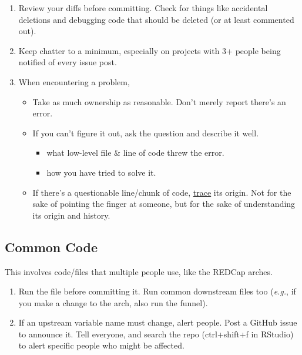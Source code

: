 \documentclass[]{book}
\providecommand{\tightlist}{%
  \setlength{\itemsep}{0pt}\setlength{\parskip}{0pt}}
\begin{document}
\begin{enumerate}
\def\labelenumi{\arabic{enumi}.}
\item
  Review your diffs before committing. Check for things like accidental deletions and debugging code that should be deleted (or at least commented out).
\item
  Keep chatter to a minimum, especially on projects with 3+ people being notified of every issue post.
\item
  When encountering a problem,

  \begin{itemize}
  \tightlist
  \item
    Take as much ownership as reasonable. Don't merely report there's an error.\\
  \item
    If you can't figure it out, ask the question and describe it well.

    \begin{itemize}
    \tightlist
    \item
      what low-level file \& line of code threw the error.
    \item
      how you have tried to solve it.
    \end{itemize}
  \item
    If there's a questionable line/chunk of code, \href{https://help.github.com/articles/tracing-changes-in-a-file/}{trace} its origin. Not for the sake of pointing the finger at someone, but for the sake of understanding its origin and history.
  \end{itemize}
\end{enumerate}

\hypertarget{common-code}{%
\subsection{Common Code}\label{common-code}}

This involves code/files that multiple people use, like the REDCap arches.

\begin{enumerate}
\def\labelenumi{\arabic{enumi}.}
\tightlist
\item
  Run the file before committing it. Run common downstream files too (\emph{e.g.}, if you make a change to the arch, also run the funnel).
\item
  If an upstream variable name must change, alert people. Post a GitHub issue to announce it. Tell everyone, and search the repo (ctrl+shift+f in RStudio) to alert specific people who might be affected.
\end{enumerate}
\end{document}
